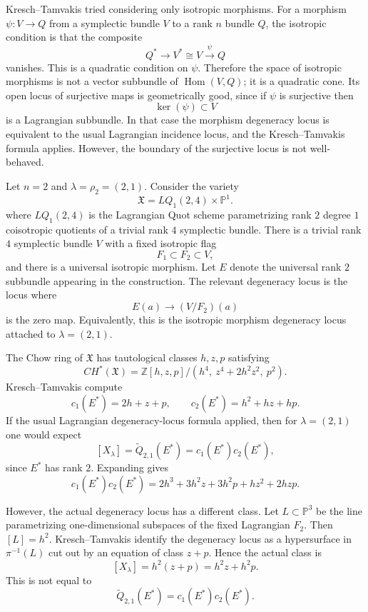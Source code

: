 \documentclass[12pt]{article}
\begin{document}
Kresch--Tamvakis tried considering only isotropic morphisms. For a morphism $\psi:V\to Q$
from a symplectic bundle $V$ to a rank $n$ bundle $Q$, the isotropic condition is that the composite
\[
    Q^*\longrightarrow V^*\cong V\xrightarrow{\psi} Q
\]
vanishes. This is a quadratic condition on $\psi$. Therefore the space of isotropic morphisms is not a vector subbundle of $\operatorname{Hom}(V,Q)$; it is a quadratic cone. Its open locus of surjective maps is geometrically good, since if $\psi$ is surjective then
\[
    \ker(\psi)\subset V
\]
is a Lagrangian subbundle. In that case the morphism degeneracy locus is equivalent to the usual Lagrangian incidence locus, and the Kresch--Tamvakis formula applies. However, the boundary of the surjective locus is not well-behaved.

\begin{example}
    Let $n = 2$ and $\lambda = \rho_2 = (2,1)$.
    Consider the variety
    \[
        \mathfrak X=LQ_1(2,4)\times \mathbb P^1.
    \] where $LQ_1(2,4)$ is the Lagrangian Quot scheme parametrizing rank $2$ degree $1$ coisotropic quotients of a trivial rank $4$ symplectic bundle.
    There is a trivial rank $4$ symplectic bundle $V$ with a fixed isotropic flag
    \[
        F_1\subset F_2\subset V,
    \]
    and there is a universal isotropic morphism. Let $E$ denote the universal rank $2$ subbundle appearing in the construction. The relevant degeneracy locus is the locus where
    \[
        E(a)\to (V/F_2)(a)
    \]
    is the zero map. Equivalently, this is the isotropic morphism degeneracy locus attached to $\lambda=(2,1)$.

    The Chow ring of $\mathfrak X$ has tautological classes $h,z,p$ satisfying
    \[
        CH^*(\mathfrak X)
        =
        \mathbb Z[h,z,p]/(h^4,\ z^4+2h^2z^2,\ p^2).
    \]
    Kresch--Tamvakis compute
    \[
        c_1(E^*)=2h+z+p,
        \qquad
        c_2(E^*)=h^2+hz+hp.
    \]
    If the usual Lagrangian degeneracy-locus formula applied, then for
    $\lambda=(2,1)$ one would expect
    \[
        [X_\lambda]
        =
        \widetilde Q_{2,1}(E^*)
        =
        c_1(E^*)c_2(E^*),
    \]
    since $E^*$ has rank $2$. Expanding gives
    \[
        c_1(E^*)c_2(E^*)
        =
        2h^3+3h^2z+3h^2p+hz^2+2hzp.
    \]

    However, the actual degeneracy locus has a different class. Let $L\subset \mathbb P^3$
    be the line parametrizing one-dimensional subspaces of the fixed Lagrangian $F_2$. Then $[L]=h^2$.
    Kresch--Tamvakis identify the degeneracy locus as a hypersurface in $\pi^{-1}(L)$ cut out by an equation of class $z+p$.
    Hence the actual class is
    \[
        [X_\lambda]
        =
        h^2(z+p)
        =
        h^2z+h^2p.
    \]
    This is not equal to
    \[
        \widetilde Q_{2,1}(E^*)=c_1(E^*)c_2(E^*).
    \]


\end{example}
\end{document}
